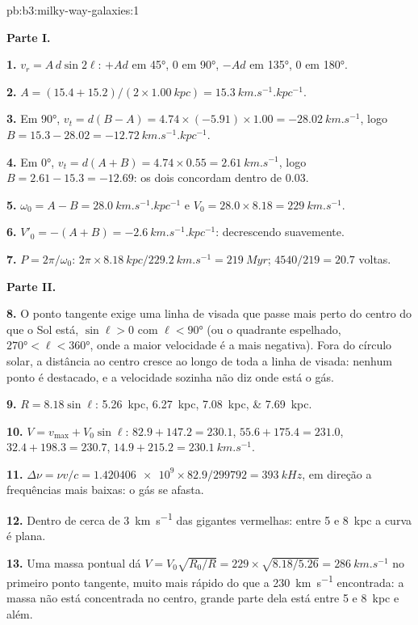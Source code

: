 \begin{solution}{pb:b3:milky-way-galaxies:1}

\textbf{Parte I.}

\textbf{1.} $v_r = A\,d\sin2\ell$: $+A d$ em \ang{45}, 0 em \ang{90}, $-A d$ em
\ang{135}, 0 em \ang{180}.

\textbf{2.} $A = (15.4 + 15.2)/(2\times\qty{1.00}{kpc}) =
\qty{15.3}{km.s^{-1}.kpc^{-1}}$.

\textbf{3.} Em \ang{90}, $v_t = d(B - A) = 4.74\times(-5.91)\times1.00 =
\qty{-28.02}{km.s^{-1}}$, logo $B = 15.3 - 28.02 =
\qty{-12.72}{km.s^{-1}.kpc^{-1}}$.

\textbf{4.} Em \ang{0}, $v_t = d(A + B) = 4.74\times0.55 =
\qty{2.61}{km.s^{-1}}$, logo $B = 2.61 - 15.3 = \num{-12.69}$: os dois
concordam dentro de \num{0.03}.

\textbf{5.} $\omega_0 = A - B = \qty{28.0}{km.s^{-1}.kpc^{-1}}$ e
$V_0 = 28.0\times8.18 = \qty{229}{km.s^{-1}}$.

\textbf{6.} $V'_0 = -(A + B) = \qty{-2.6}{km.s^{-1}.kpc^{-1}}$: decrescendo suavemente.

\textbf{7.} $P = 2\pi/\omega_0$: $2\pi\times\qty{8.18}{kpc}/\qty{229.2}{km.s^{-1}}
= \qty{219}{Myr}$; $4540/219 = 20.7$ voltas.

\textbf{Parte II.}

\textbf{8.} O ponto tangente exige uma linha de visada que passe mais perto do
centro do que o Sol está, $\sin\ell > 0$ com $\ell < \ang{90}$ (ou o
quadrante espelhado, $\ang{270} < \ell < \ang{360}$, onde a maior
velocidade é a mais negativa). Fora do círculo solar, a distância
ao centro cresce ao longo de toda a linha de visada: nenhum ponto é
destacado, e a velocidade sozinha não diz onde está o gás.

\textbf{9.} $R = 8.18\sin\ell$: \qtylist{5.26;6.27;7.08;7.69}{kpc}.

\textbf{10.} $V = v_\mathrm{max} + V_0\sin\ell$: $82.9 + 147.2 = 230.1$,
$55.6 + 175.4 = 231.0$, $32.4 + 198.3 = 230.7$, $14.9 + 215.2 =
\qty{230.1}{km.s^{-1}}$.

\textbf{11.} $\Delta\nu = \nu v/c = \num{1.420406e9}\times82.9/299792 =
\qty{393}{kHz}$, em direção a frequências mais baixas: o gás se afasta.

\textbf{12.} Dentro de cerca de \qty{3}{km.s^{-1}} das gigantes vermelhas: entre 5 e
\qty{8}{kpc} a curva é plana.

\textbf{13.} Uma massa pontual dá $V = V_0\sqrt{R_0/R} = 229\times\sqrt{8.18/5.26} =
\qty{286}{km.s^{-1}}$ no primeiro ponto tangente, muito mais rápido do que a
\qty{230}{km.s^{-1}} encontrada: a massa não está concentrada no centro,
grande parte dela está entre 5 e \qty{8}{kpc} e além.


\end{solution}
